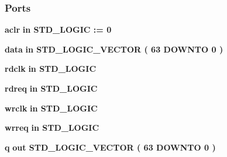 \subsubsection*{Ports}
 \begin{DoxyCompactItemize}
\item 
{\bf aclr}  {\bfseries {\bfseries \textcolor{keywordflow}{in}\textcolor{vhdlchar}{ }}} {\bfseries \textcolor{comment}{S\+T\+D\+\_\+\+L\+O\+G\+IC}\textcolor{vhdlchar}{ }\textcolor{vhdlchar}{ }\textcolor{vhdlchar}{\+:}\textcolor{vhdlchar}{=}\textcolor{vhdlchar}{ }\textcolor{vhdlchar}{ }\textcolor{vhdlchar}{\textquotesingle{}}\textcolor{vhdlchar}{ } \textcolor{vhdldigit}{0} \textcolor{vhdlchar}{ }\textcolor{vhdlchar}{\textquotesingle{}}\textcolor{vhdlchar}{ }} 
\item 
{\bf data}  {\bfseries {\bfseries \textcolor{keywordflow}{in}\textcolor{vhdlchar}{ }}} {\bfseries \textcolor{comment}{S\+T\+D\+\_\+\+L\+O\+G\+I\+C\+\_\+\+V\+E\+C\+T\+OR}\textcolor{vhdlchar}{ }\textcolor{vhdlchar}{(}\textcolor{vhdlchar}{ }\textcolor{vhdlchar}{ } \textcolor{vhdldigit}{63} \textcolor{vhdlchar}{ }\textcolor{keywordflow}{D\+O\+W\+N\+TO}\textcolor{vhdlchar}{ }\textcolor{vhdlchar}{ } \textcolor{vhdldigit}{0} \textcolor{vhdlchar}{ }\textcolor{vhdlchar}{)}\textcolor{vhdlchar}{ }} 
\item 
{\bf rdclk}  {\bfseries {\bfseries \textcolor{keywordflow}{in}\textcolor{vhdlchar}{ }}} {\bfseries \textcolor{comment}{S\+T\+D\+\_\+\+L\+O\+G\+IC}\textcolor{vhdlchar}{ }} 
\item 
{\bf rdreq}  {\bfseries {\bfseries \textcolor{keywordflow}{in}\textcolor{vhdlchar}{ }}} {\bfseries \textcolor{comment}{S\+T\+D\+\_\+\+L\+O\+G\+IC}\textcolor{vhdlchar}{ }} 
\item 
{\bf wrclk}  {\bfseries {\bfseries \textcolor{keywordflow}{in}\textcolor{vhdlchar}{ }}} {\bfseries \textcolor{comment}{S\+T\+D\+\_\+\+L\+O\+G\+IC}\textcolor{vhdlchar}{ }} 
\item 
{\bf wrreq}  {\bfseries {\bfseries \textcolor{keywordflow}{in}\textcolor{vhdlchar}{ }}} {\bfseries \textcolor{comment}{S\+T\+D\+\_\+\+L\+O\+G\+IC}\textcolor{vhdlchar}{ }} 
\item 
{\bf q}  {\bfseries {\bfseries \textcolor{keywordflow}{out}\textcolor{vhdlchar}{ }}} {\bfseries \textcolor{comment}{S\+T\+D\+\_\+\+L\+O\+G\+I\+C\+\_\+\+V\+E\+C\+T\+OR}\textcolor{vhdlchar}{ }\textcolor{vhdlchar}{(}\textcolor{vhdlchar}{ }\textcolor{vhdlchar}{ } \textcolor{vhdldigit}{63} \textcolor{vhdlchar}{ }\textcolor{keywordflow}{D\+O\+W\+N\+TO}\textcolor{vhdlchar}{ }\textcolor{vhdlchar}{ } \textcolor{vhdldigit}{0} \textcolor{vhdlchar}{ }\textcolor{vhdlchar}{)}\textcolor{vhdlchar}{ }} 

\end{DoxyCompactItemize}
